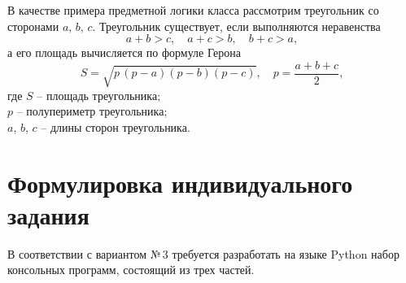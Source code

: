 \documentclass[14pt,a4paper]{extarticle}
\newcommand{\variant}{3}
\begin{document}
В качестве примера предметной логики класса рассмотрим треугольник со сторонами $a$, $b$, $c$. Треугольник существует, если выполняются неравенства
\begin{equation}
  a + b > c, \quad a + c > b, \quad b + c > a,
\end{equation}
а его площадь вычисляется по формуле Герона
\begin{equation}
  S = \sqrt{p\,(p - a)(p - b)(p - c)}, \quad p = \frac{a + b + c}{2},
\end{equation}
\noindent где $S$ -- площадь треугольника;\\
$p$ -- полупериметр треугольника;\\
$a$, $b$, $c$ -- длины сторон треугольника.

\section{Формулировка индивидуального задания}
В соответствии с вариантом №\,\variant{} требуется разработать на языке Python набор консольных программ, состоящий из трех частей.
\end{document}
